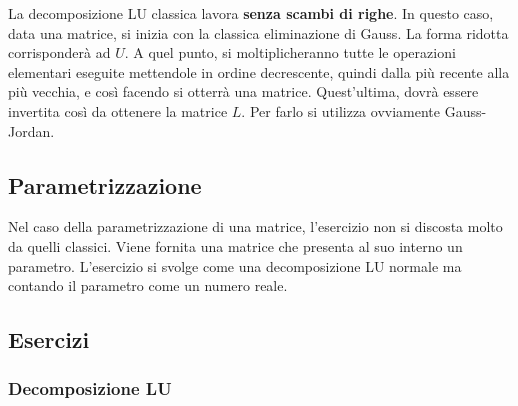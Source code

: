 \documentclass[a4paper]{article}
\begin{document}
	\noindent
	La decomposizione LU classica lavora \textbf{senza scambi di righe}. In questo caso, data una matrice, si inizia con la classica eliminazione di Gauss. La forma ridotta corrisponderà ad $U$. A quel punto, si moltiplicheranno tutte le operazioni elementari eseguite mettendole in ordine decrescente, quindi dalla più recente alla più vecchia, e così facendo si otterrà una matrice. Quest'ultima, dovrà essere invertita così da ottenere la matrice $L$. Per farlo si utilizza ovviamente Gauss-Jordan.
	
	\subsection{Parametrizzazione}
	
	Nel caso della parametrizzazione di una matrice, l'esercizio non si discosta molto da quelli classici. Viene fornita una matrice che presenta al suo interno un parametro. L'esercizio si svolge come una decomposizione LU normale ma contando il parametro come un numero reale.
	
	\subsection{Esercizi}
	
	\subsubsection{Decomposizione LU}\label{Decomposizione LU ex}
	
\end{document}
